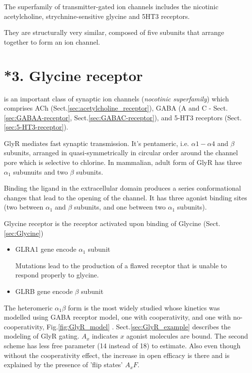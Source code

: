 The superfamily of transmitter-gated ion channels 
includes the nicotinic acetylcholine, strychnine-sensitive glycine and 5HT3
receptors. 

They are structurally very similar, composed of five subunits that arrange
together to form an ion channel.

\section{*3. Glycine receptor}
\label{sec:Glycine-receptor}


is an important class of synaptic ion channels ({\it nocotinic
superfamily}) which comprises ACh (Sect.\ref{sec:acetylcholine_receptor}), GABA
(A and C - Sect.\ref{sec:GABAA-receptor}, Sect.\ref{sec:GABAC-receptor}), and
5-HT3 receptors (Sect.\ref{sec:5-HT3-receptor}).

GlyR mediates fast synaptic transmission. It's pentameric, i.e.
$\alpha 1-\alpha 4$ and $\beta$ subunits, arranged in quasi-symmetrically in
circular order around the channel pore which is selective to chlorine.
In mammalian, adult form of GlyR has three $\alpha_1$ subunuits and two $\beta$
subunits. 

Binding the ligand in the extracellular domain produces a series conformational
changes that lead to the opening of the channel. It has three agonist binding
sites (two between $\alpha_1$ and $\beta$ subunits, and one between two
$\alpha_1$ subunits).

Glycine receptor is the receptor activated upon binding of Glycine
(Sect.\ref{sec:Glycine}) 
\begin{itemize}
  \item GLRA1 gene encode $\alpha_1 $ subunit 
  
Mutations lead to the production of a flawed receptor that is unable to respond
properly to glycine.

  \item GLRB gene encode $\beta$ subunit
  
\end{itemize}

The heteromeric $\alpha_1\beta$ form is the most widely studied whose kinetics
was modelled using GABA receptor model, one with cooperativity, and one with
no-cooperativity, Fig.\ref{fig:GlyR_model} \citep{jones1995, burzomato2004}.
Sect.\ref{sec:GlyR_example} describes the modeling of GlyR gating.
$A_x$ indicates $x$ agonist molecules are bound. The second scheme has less
free parameter (14 instead of 18) to estimate. Also even though without the
cooperativity effect, the increase in open efficacy is there and is explained by
the presence of 'flip states' $A_xF$.

